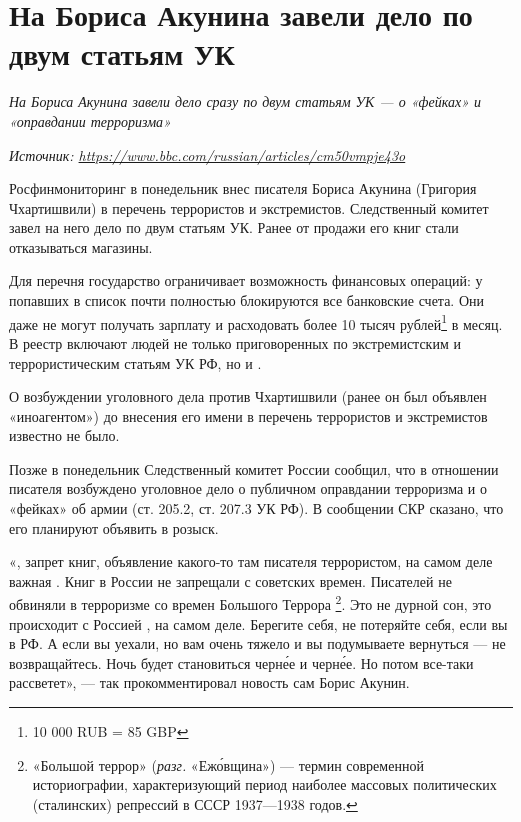 
\section[Про Бориса Акунина]{На Бориса Акунина завели дело по двум статьям УК}

\textit{На Бориса Акунина завели дело сразу по двум статьям УК --- о «фейках» и «оправдании терроризма»}

\textit{Источник: \url{https://www.bbc.com/russian/articles/cm50vmpje43o}}

\begin{fancyquotes}
    Росфинмониторинг в понедельник внес писателя Бориса Акунина (Григория Чхартишвили) в перечень террористов и экстремистов. Следственный комитет завел на него дело по двум статьям УК. Ранее от продажи его книг стали отказываться магазины.
\end{fancyquotes}

Для 
перечня государство ограничивает возможность
финансовых операций:
у попавших в список почти полностью блокируются
все банковские счета.
Они даже не могут получать зарплату и расходовать более
10 тысяч рублей\footnote{10 000 RUB = 85 GBP} в месяц.
В реестр включают людей не только приговоренных
по экстремистским и террористическим статьям УК РФ,
но и .

О возбуждении уголовного дела против Чхартишвили (ранее он был объявлен «иноагентом») до внесения его имени в перечень террористов и экстремистов известно не было.

Позже в понедельник Следственный комитет России сообщил, что в отношении писателя возбуждено уголовное дело о публичном оправдании терроризма и о «фейках» об армии (ст. 205.2, ст. 207.3 УК РФ). В сообщении СКР сказано, что его планируют объявить в розыск.

«, запрет книг,
объявление какого-то там писателя террористом, на самом деле важная
.
Книг в России не запрещали с советских времен.
Писателей не обвиняли в терроризме со времен Большого Террора%
\footnote{«Большой террор» (\textit{разг.} «Еж\'{о}вщина»)
--- термин современной историографии, характеризующий период
наиболее массовых политических (сталинских) репрессий
в СССР 1937—1938 годов.}.
Это не дурной сон, это происходит с Россией
, на самом деле.
Берегите себя, не потеряйте себя, если вы в РФ.
А если вы уехали, но вам очень тяжело
 и вы подумываете вернуться
--- не возвращайтесь.
Ночь будет становиться черн\'{е}е и черн\'{е}е.
Но потом все-таки рассветет», ---
так прокомментировал новость сам Борис Акунин.

